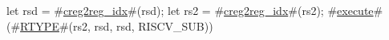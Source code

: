 let rsd = #\hyperref[sailRISCVzcreg2regzyidx]{creg2reg\_idx}#(rsd);
let rs2 = #\hyperref[sailRISCVzcreg2regzyidx]{creg2reg\_idx}#(rs2);
#\hyperref[sailRISCVzexecute]{execute}#(#\hyperref[sailRISCVzRTYPE]{RTYPE}#(rs2, rsd, rsd, RISCV_SUB))
